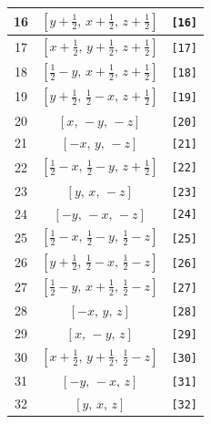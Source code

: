 \documentclass[fleqn,8pt]{jsarticle}
\begin{document}
\begin{longtable}{ccc}
16 & $\left[ y + \frac{1}{2},\, x + \frac{1}{2},\, z + \frac{1}{2} \right]$ & {\tt [16]} \\ \hline
17 & $\left[ x + \frac{1}{2},\, y + \frac{1}{2},\, z + \frac{1}{2} \right]$ & {\tt [17]} \\ \hline
18 & $\left[ \frac{1}{2} - y,\, x + \frac{1}{2},\, z + \frac{1}{2} \right]$ & {\tt [18]} \\ \hline
19 & $\left[ y + \frac{1}{2},\, \frac{1}{2} - x,\, z + \frac{1}{2} \right]$ & {\tt [19]} \\ \hline
20 & $\left[ x,\, - y,\, - z \right]$ & {\tt [20]} \\ \hline
21 & $\left[ - x,\, y,\, - z \right]$ & {\tt [21]} \\ \hline
22 & $\left[ \frac{1}{2} - x,\, \frac{1}{2} - y,\, z + \frac{1}{2} \right]$ & {\tt [22]} \\ \hline
23 & $\left[ y,\, x,\, - z \right]$ & {\tt [23]} \\ \hline
24 & $\left[ - y,\, - x,\, - z \right]$ & {\tt [24]} \\ \hline
25 & $\left[ \frac{1}{2} - x,\, \frac{1}{2} - y,\, \frac{1}{2} - z \right]$ & {\tt [25]} \\ \hline
26 & $\left[ y + \frac{1}{2},\, \frac{1}{2} - x,\, \frac{1}{2} - z \right]$ & {\tt [26]} \\ \hline
27 & $\left[ \frac{1}{2} - y,\, x + \frac{1}{2},\, \frac{1}{2} - z \right]$ & {\tt [27]} \\ \hline
28 & $\left[ - x,\, y,\, z \right]$ & {\tt [28]} \\ \hline
29 & $\left[ x,\, - y,\, z \right]$ & {\tt [29]} \\ \hline
30 & $\left[ x + \frac{1}{2},\, y + \frac{1}{2},\, \frac{1}{2} - z \right]$ & {\tt [30]} \\ \hline
31 & $\left[ - y,\, - x,\, z \right]$ & {\tt [31]} \\ \hline
32 & $\left[ y,\, x,\, z \right]$ & {\tt [32]} \\
\end{longtable}
\end{document}
